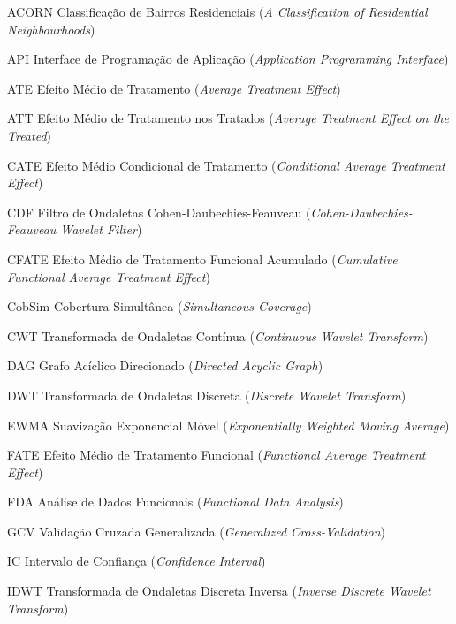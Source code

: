 \documentclass[
  oldfontcommands,
  sumario=tradicional,
  12pt,      %
  openright,    %
  oneside,    %
  a4paper,    %
  english,    %
  brazilian      %
]{imecc-unicamp}
\begin{document}
\listoffigures*
\cleardoublepage
\listoftables*
\cleardoublepage
\begin{siglas}
  \item[ACORN] Classificação de Bairros Residenciais (\emph{A Classification of Residential Neighbourhoods})
  \item[API] Interface de Programação de Aplicação (\emph{Application Programming Interface})
  \item[ATE] Efeito Médio de Tratamento (\emph{Average Treatment Effect})
  \item[ATT] Efeito Médio de Tratamento nos Tratados (\emph{Average Treatment Effect on the Treated})
  \item[CATE] Efeito Médio Condicional de Tratamento (\emph{Conditional Average Treatment Effect})
  \item[CDF] Filtro de Ondaletas Cohen-Daubechies-Feauveau (\emph{Cohen-Daubechies-Feauveau Wavelet Filter})
  \item[CFATE] Efeito Médio de Tratamento Funcional Acumulado (\emph{Cumulative Functional Average Treatment Effect})
  \item[CobSim] Cobertura Simultânea (\emph{Simultaneous Coverage})
  \item[CWT] Transformada de Ondaletas Contínua (\emph{Continuous Wavelet Transform})
  \item[DAG] Grafo Acíclico Direcionado (\emph{Directed Acyclic Graph})
  \item[DWT] Transformada de Ondaletas Discreta (\emph{Discrete Wavelet Transform})
  \item[EWMA] Suavização Exponencial Móvel (\emph{Exponentially Weighted Moving Average})
  \item[FATE] Efeito Médio de Tratamento Funcional (\emph{Functional Average Treatment Effect})
  \item[FDA] Análise de Dados Funcionais (\emph{Functional Data Analysis})
  \item[GCV] Validação Cruzada Generalizada (\emph{Generalized Cross-Validation})
  \item[IC] Intervalo de Confiança (\emph{Confidence Interval})
  \item[IDWT] Transformada de Ondaletas Discreta Inversa (\emph{Inverse Discrete Wavelet Transform})

\end{siglas}
\end{document}
